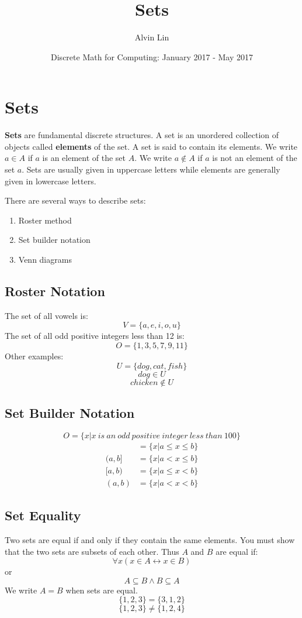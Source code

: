 \documentclass{math}
\title{Sets}
\author{Alvin Lin}
\date{Discrete Math for Computing: January 2017 - May 2017}
\begin{document}
\maketitle

\section*{Sets}
\textbf{Sets} are fundamental discrete structures. A set is an unordered
collection of objects called \textbf{elements} of the set. A set is said
to contain its elements. We write \( a \in A \) if \( a \) is an element of the
set \( A \). We write \( a \notin A \) if \( a \) is not an element of the set
\( a \). Sets are usually given in uppercase letters while elements are
generally given in lowercase letters. \par
There are several ways to describe sets:
\begin{enumerate}
  \item Roster method
  \item Set builder notation
  \item Venn diagrams
\end{enumerate}

\subsection*{Roster Notation}
The set of all vowels is:
\[ V = \bigg\{a,e,i,o,u\bigg\} \]
The set of all odd positive integers less than 12 is:
\[ O = \bigg\{1,3,5,7,9,11\bigg\} \]
Other examples:
\[ U = \bigg\{dog,cat,fish\bigg\} \]
\[ dog \in U \]
\[ chicken \notin U \]

\subsection*{Set Builder Notation}
\[ O = \bigg\{x|x\ is\ an\ odd\ positive\ integer\ less\ than\ 100\bigg\} \]
\begin{align*}
  [a,b] &= \bigg\{x|a \leq x \leq b \bigg\} \\
  (a,b] &= \bigg\{x|a < x \leq b \bigg\} \\
  [a,b) &= \bigg\{x|a \leq x < b \bigg\} \\
  (a,b) &= \bigg\{x|a < x < b \bigg\}
\end{align*}

\subsection*{Set Equality}
Two sets are equal if and only if they contain the same elements. You must show
that the two sets are subsets of each other. Thus \( A \) and \( B \) are equal
if:
\[ \forall{x}(x \in A \leftrightarrow x \in B) \]
or
\[ A \subseteq B \wedge B \subseteq A \]
We write \( A = B \) when sets are equal.
\[ \bigg\{1,2,3\bigg\} = \bigg\{3,1,2\bigg\} \]
\[ \bigg\{1,2,3\bigg\} \neq \bigg\{1,2,4\bigg\} \]
\end{document}
